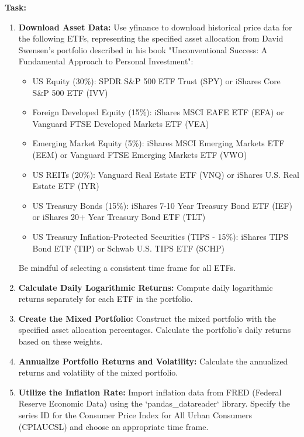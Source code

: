 \documentclass{article}
\begin{document}
\textbf{Task:}
\begin{enumerate}
    \item \textbf{Download Asset Data:} Use yfinance to download historical price data for the following ETFs, representing the specified asset allocation from David Swensen's portfolio described in his book "Unconventional Success: A Fundamental Approach to Personal Investment":
    
    \begin{itemize}
        \item US Equity (30\%): SPDR S\&P 500 ETF Trust (SPY) or iShares Core S\&P 500 ETF (IVV)
        \item Foreign Developed Equity (15\%): iShares MSCI EAFE ETF (EFA) or Vanguard FTSE Developed Markets ETF (VEA)
        \item Emerging Market Equity (5\%): iShares MSCI Emerging Markets ETF (EEM) or Vanguard FTSE Emerging Markets ETF (VWO)
        \item US REITs (20\%): Vanguard Real Estate ETF (VNQ) or iShares U.S. Real Estate ETF (IYR)
        \item US Treasury Bonds (15\%): iShares 7-10 Year Treasury Bond ETF (IEF) or iShares 20+ Year Treasury Bond ETF (TLT)
        \item US Treasury Inflation-Protected Securities (TIPS - 15\%): iShares TIPS Bond ETF (TIP) or Schwab U.S. TIPS ETF (SCHP)
    \end{itemize}
    
    Be mindful of selecting a consistent time frame for all ETFs.
    
    \item \textbf{Calculate Daily Logarithmic Returns:} Compute daily logarithmic returns separately for each ETF in the portfolio.
    
    \item \textbf{Create the Mixed Portfolio:} Construct the mixed portfolio with the specified asset allocation percentages. Calculate the portfolio's daily returns based on these weights.
    
    \item \textbf{Annualize Portfolio Returns and Volatility:} Calculate the annualized returns and volatility of the mixed portfolio.
    
    \item \textbf{Utilize the Inflation Rate:} Import inflation data from FRED (Federal Reserve Economic Data) using the `pandas\_datareader` library. Specify the series ID for the Consumer Price Index for All Urban Consumers (CPIAUCSL) and choose an appropriate time frame.
    

\end{enumerate}
\end{document}
